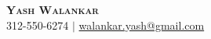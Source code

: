 \documentclass[letterpaper,11pt]{article}
\begin{document}

\textbf{\Huge \scshape Yash Walankar} \\ \vspace{1pt}
\small 312-550-6274 $|$ \href{mailto:x@x.com}{{walankar.yash@gmail.com}}









\vspace{-10pt}
\end{document}
